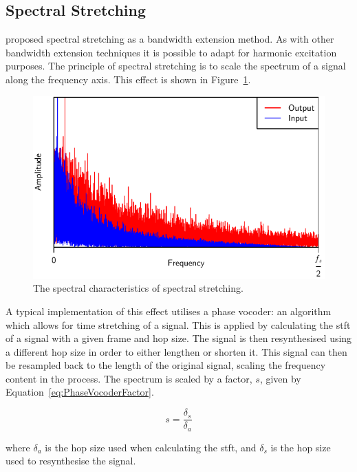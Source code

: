 	\subsection{Spectral Stretching}
	\label{sec:Excitation-Methods-SpectralStretching}
		\citet{nagel2009a} proposed spectral stretching as a bandwidth extension method. As with other bandwidth
		extension techniques it is possible to adapt for harmonic excitation purposes. The principle of spectral
		stretching is to scale the spectrum of a signal along the frequency axis. This effect is shown in
		Figure~\ref{fig:SpectralStretching}.

		\begin{figure}[h!]
			\centering
			\includegraphics{chapter3/Images/SpectralStretchingSpectrum.pdf}
			\caption{The spectral characteristics of spectral stretching.}
			\label{fig:SpectralStretching}
		\end{figure}

		A typical implementation of this effect utilises a phase vocoder: an algorithm which allows for time
		stretching of a signal. This is applied by calculating the \acrshort{stft} of a signal with a given frame
		and hop size. The signal is then resynthesised using a different hop size in order to either lengthen or
		shorten it. This signal can then be resampled back to the length of the original signal, scaling the
		frequency content in the process. The spectrum is scaled by a factor, $s$, given by
		Equation~\ref{eq:PhaseVocoderFactor}.

		\begin{equation}
			s = \frac{\delta_{s}}{\delta_{a}}
			\label{eq:PhaseVocoderFactor}
		\end{equation}

		where $\delta_{a}$ is the hop size used when calculating the \acrshort{stft}, and $\delta_{s}$ is the hop
		size used to resynthesise the signal.


